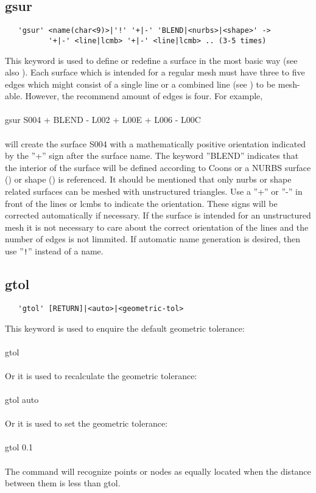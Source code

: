 \documentclass{article}
\begin{document}
\subsection{\label{gsur}gsur}
\begin{verbatim}
   'gsur' <name(char<9)>|'!' '+|-' 'BLEND|<nurbs>|<shape>' ->
          '+|-' <line|lcmb> '+|-' <line|lcmb> .. (3-5 times)
\end{verbatim}
This keyword is used to define or redefine a surface in the most basic way (see also ). Each surface which is intended for a regular mesh must have three to five edges which might consist of a single line or a combined line (see ) to be mesh-able. However, the recommend amount of edges is four. For example,\\\\gsur S004 + BLEND  - L002 + L00E + L006 - L00C\\\\will create the surface S004 with a mathematically positive orientation indicated by the ''+'' sign after the surface name. The keyword ''BLEND'' indicates that the interior of the surface will be defined according to Coons \cite{Coons} or a NURBS surface () or shape () is referenced. It should be mentioned that only nurbs or shape related surfaces can be meshed with unstructured triangles. Use a  ''+'' or ''-'' in front of the lines or lcmbs to indicate the orientation. These signs will be corrected automatically if necessary. If the surface is intended for an unstructured mesh it is not necessary to care about the correct orientation of the lines and the number of edges is not limmited. If automatic name generation is desired, then use ''\verb_!_'' instead of a name.

\subsection{\label{gtol}gtol}
\begin{verbatim}
   'gtol' [RETURN]|<auto>|<geometric-tol>
\end{verbatim}
This keyword is used to enquire the default geometric tolerance:\\\\
gtol\\\\
Or it is used to recalculate the geometric tolerance:\\\\
gtol auto\\\\
Or it is used to set the geometric tolerance:\\\\
gtol 0.1\\\\
The  command will recognize points or nodes as equally located when the distance between them is less than gtol.
\end{document}
